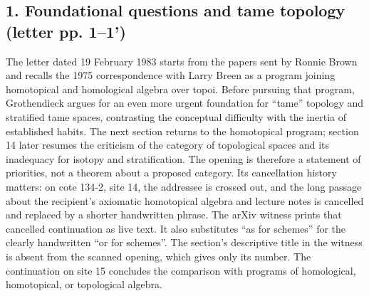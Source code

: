 \documentclass[10pt,oneside]{book}
\begin{document}
\subsection*{1. Foundational questions and tame topology (letter pp. 1--1')}
The letter dated 19 February 1983 starts from the papers sent by Ronnie Brown and recalls the 1975 correspondence with Larry Breen as a program joining homotopical and homological algebra over topoi. Before pursuing that program, Grothendieck argues for an even more urgent foundation for ``tame'' topology and stratified tame spaces, contrasting the conceptual difficulty with the inertia of established habits. The next section returns to the homotopical program; section 14 later resumes the criticism of the category of topological spaces and its inadequacy for isotopy and stratification. The opening is therefore a statement of priorities, not a theorem about a proposed category. Its cancellation history matters: on cote 134-2, site 14, the addressee is crossed out, and the long passage about the recipient's axiomatic homotopical algebra and lecture notes is cancelled and replaced by a shorter handwritten phrase. The arXiv witness prints that cancelled continuation as live text. It also substitutes ``as for schemes'' for the clearly handwritten ``or for schemes''. The section's descriptive title in the witness is absent from the scanned opening, which gives only its number. The continuation on site 15 concludes the comparison with programs of homological, homotopical, or topological algebra.
\end{document}

